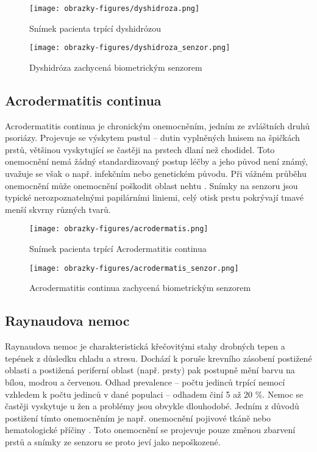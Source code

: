 \begin{figure}[!htbp]
  \begin{minipage}[b]{0.5\linewidth}
    \centering
    \texttt{[image: obrazky-figures/dyshidroza.png]}
    \caption{Snímek pacienta trpící dyshidrózou \cite{InfluenceSkinDiseases}}
  \end{minipage}
  \hspace{0.5cm}
  \begin{minipage}[b]{0.5\linewidth}
    \centering
    \texttt{[image: obrazky-figures/dyshidroza\_senzor.png]}
    \caption{Dyshidróza zachycená biometrickým senzorem \cite{Barotova}}
  \end{minipage}
\end{figure}

\subsection{Acrodermatitis continua}
Acrodermatitis continua je chronickým onemocněním, jedním ze zvláštních druhů psoriázy. Projevuje se výskytem pustul -- dutin vyplněných hnisem na špičkách prstů, většinou vyskytující se častěji na prstech dlaní než chodidel. Toto onemocnění nemá žádný standardizovaný postup léčby a jeho původ není známý, uvažuje se však o např. infekčním nebo genetickém původu. Při vážném průběhu onemocnění může onemocnění poškodit oblast nehtu \cite{AcrodermatitisContinua}. Snímky na senzoru jsou typické nerozpoznatelnými papilárními liniemi, celý otisk prstu pokrývají tmavé menší skvrny různých tvarů.

\begin{figure}[!htbp]
  \begin{minipage}[b]{0.5\linewidth}
    \centering
    \texttt{[image: obrazky-figures/acrodermatis.png]}
    \caption{Snímek pacienta trpící Acrodermatitis continua \cite{AcrodermatitisContinua}}
  \end{minipage}
  \hspace{0.5cm}
  \begin{minipage}[b]{0.5\linewidth}
    \centering
    \texttt{[image: obrazky-figures/acrodermatis\_senzor.png]}
    \caption{Acrodermatitis continua zachycená biometrickým senzorem \cite{Barotova}}
  \end{minipage}
\end{figure}

\subsection{Raynaudova nemoc}
Raynaudova nemoc je charakteristická křečovitými stahy drobných tepen a tepének z důsledku chladu a stresu. Dochází k poruše krevního zásobení postižené oblasti a postižená periferní oblast (např. prsty) pak postupně mění barvu na bílou, modrou a červenou. Odhad prevalence -- počtu jedinců trpící nemocí vzhledem k počtu jedinců v dané populaci -- odhadem činí 5 až 20 \%. Nemoc se častěji vyskytuje u žen a problémy jsou obvykle dlouhodobé. Jedním z důvodů postižení tímto onemocněním je např. onemocnění pojivové tkáně nebo hematologické příčiny \cite{InfluenceSkinDiseases}. Toto onemocnění se projevuje pouze změnou zbarvení prstů a snímky ze senzoru se proto jeví jako nepoškozené.

